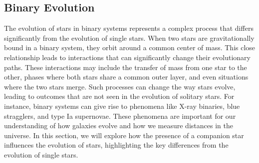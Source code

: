 \documentclass[main.tex]{subfiles}
\begin{document}
    \subsection{Binary Evolution}\label{sec:ch1:binaries}
    The evolution of stars in binary systems represents a complex process that differs significantly from the evolution of single stars. When two stars are gravitationally bound in a binary system, they orbit around a common center of mass. This close relationship leads to interactions that can significantly change their evolutionary paths. These interactions may include the transfer of mass from one star to the other, phases where both stars share a common outer layer, and even situations where the two stars merge. Such processes can change the way stars evolve, leading to outcomes that are not seen in the evolution of solitary stars. For instance, binary systems can give rise to phenomena like X-ray binaries, blue stragglers, and type Ia supernovae. These phenomena are important for our understanding of how galaxies evolve and how we measure distances in the universe. In this section, we will explore how the presence of a companion star influences the evolution of stars, highlighting the key differences from the evolution of single stars.
\end{document}
